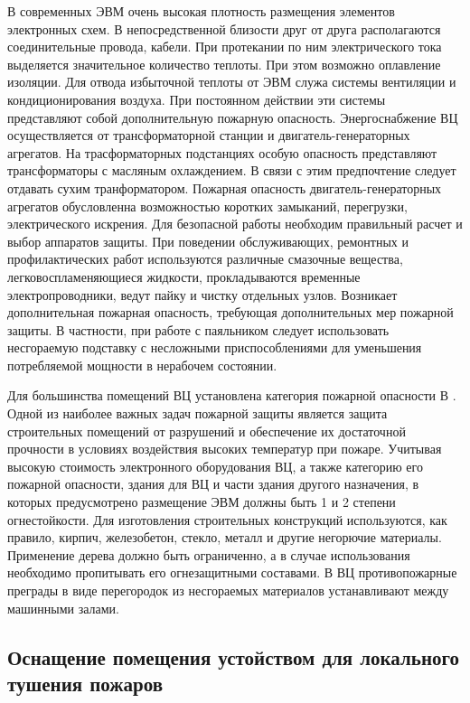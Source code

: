 В современных ЭВМ очень высокая плотность размещения элементов электронных схем. В непосредственной близости
друг от друга располагаются соединительные провода, кабели. При протекании по ним электрического тока выделяется
значительное количество теплоты. При этом возможно оплавление изоляции. Для отвода избыточной теплоты от ЭВМ служа
системы вентиляции и кондиционирования воздуха. При постоянном действии эти системы представляют собой дополнительную
пожарную опасность. Энергоснабжение ВЦ осуществляется от трансформаторной станции и двигатель-генераторных агрегатов.
На трасформаторных подстанциях особую опасность представляют трансформаторы с масляным охлаждением. В связи с этим
предпочтение следует отдавать сухим транформатором. Пожарная опасность двигатель-генераторных агрегатов обусловленна
возможностью коротких замыканий, перегрузки, электрического искрения. Для безопасной работы необходим правильный
расчет и выбор аппаратов защиты. При поведении обслуживающих, ремонтных и профилактических работ используются
различные смазочные вещества, легковоспламеняющиеся жидкости, прокладываются временные электропроводники, ведут пайку
и чистку отдельных узлов. Возникает дополнительная пожарная опасность, требующая дополнительных мер пожарной защиты.
В частности, при работе с паяльником следует использовать несгораемую подставку с несложными приспособлениями
для уменьшения потребляемой мощности в нерабочем состоянии.

Для большинства помещений ВЦ установлена категория пожарной опасности В \cite{npb10503}. Одной из наиболее важных задач пожарной защиты
является защита строительных помещений от разрушений и обеспечение их достаточной прочности в условиях воздействия
высоких температур при пожаре. Учитывая высокую стоимость электронного оборудования ВЦ, а также категорию его
пожарной опасности, здания для ВЦ и части здания другого назначения, в которых предусмотрено размещение ЭВМ должны
быть 1 и 2 степени огнестойкости. Для изготовления строительных конструкций используются, как правило, кирпич,
железобетон, стекло, металл и другие негорючие материалы. Применение дерева должно быть ограниченно, а в
случае использования необходимо пропитывать его огнезащитными составами. В ВЦ противопожарные преграды в виде
перегородок из несгораемых материалов устанавливают между машинными залами.

\subsection{Оснащение помещения устойством для локального тушения пожаров}

